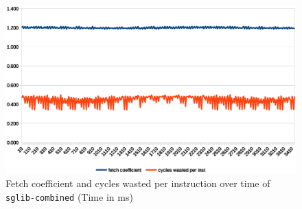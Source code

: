 \documentclass[../bachelor_paper.tex]{subfiles}
\begin{document}
\begin{figure}
    \centering
    \includegraphics[width=\textwidth]{img/graph/embench/sglib-combined_fetch_waste.eps}
    \caption{Fetch coefficient and cycles wasted per instruction over time of \texttt{sglib-combined} (Time in ms)}
    \label{fig:res/sglib/fetch_waste}
\end{figure}

\isstandalone



\fi
\end{document}
